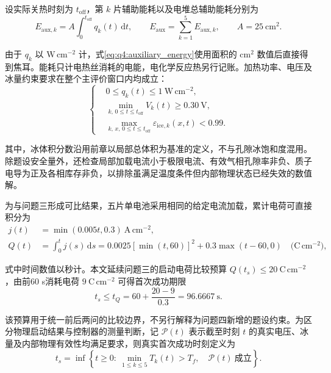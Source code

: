\documentclass[bwprint]{gmcmthesis}
\numberwithin{equation}{section}
\numberwithin{figure}{section}
\begin{document}
设实际关热时刻为 $t_{\mathrm{off}}$，第 $k$ 片辅助能耗以及电堆总辅助能耗分别为
\begin{equation}
E_{\mathrm{aux},k}=A\int_0^{t_{\mathrm{off}}}q_k(t)\,\mathrm dt,
\qquad E_{\mathrm{aux}}=\sum_{k=1}^{5}E_{\mathrm{aux},k},
\qquad A=25\ \mathrm{cm^2}.
\label{eq:q4:auxiliary_energy}
\end{equation}

由于 $q_k$ 以 $\mathrm{W\,cm^{-2}}$ 计，式\eqref{eq:q4:auxiliary_energy}使用面积的 $\mathrm{cm^2}$ 数值后直接得到焦耳。能耗只计电热丝消耗的电能，电化学反应热另行记账。加热功率、电压及冰量约束要求在整个主评价窗口内均成立：
\begin{equation}
\left\{\begin{aligned}
&0\leq q_k(t)\leq1\ \mathrm{W\,cm^{-2}},\\
&\min_{k,\,0\leq t\leq t_{\mathrm{off}}}V_k(t)\geq0.30\ \mathrm V,\\
&\max_{k,\,x,\,0\leq t\leq t_{\mathrm{off}}}\varepsilon_{\mathrm{ice},k}(x,t)<0.99.
\end{aligned}\right.
\label{eq:q4:path_constraints}
\end{equation}

其中，冰体积分数沿用前章以局部总体积为基准的定义，不与孔隙冰饱和度混用。除题设安全量外，还检查局部加载电流小于极限电流、有效气相孔隙率非负、质子电导为正及各相库存非负，以排除虽满足温度条件但内部物理状态已经失效的数值解。

为与问题三形成可比结果，五片单电池采用相同的给定电流加载，累计电荷可直接积分为
\begin{equation}
\begin{aligned}
j(t)&=\min(0.005t,0.3)\ \mathrm{A\,cm^{-2}},\\
Q(t)&=\int_0^tj(s)\,\mathrm ds
=0.0025[\min(t,60)]^2+0.3\max(t-60,0)
\quad\big(\mathrm{C\,cm^{-2}}\big),
\end{aligned}
\label{eq:q4:load_charge}
\end{equation}

式中时间数值以秒计。本文延续问题三的启动电荷比较预算 $Q(t_s)\leq20\ \mathrm{C\,cm^{-2}}$，由前60 s消耗电荷 $9\ \mathrm{C\,cm^{-2}}$ 可得首次成功期限
\begin{equation}
t_s\leq t_Q=60+\frac{20-9}{0.3}=96.6667\ \mathrm s.
\label{eq:q4:startup_deadline}
\end{equation}

该预算用于统一前后两问的比较边界，不另行解释为问题四新增的题设约束。为区分物理启动结果与控制器的测量判断，记 $\mathcal P(t)$ 表示截至时刻 $t$ 的真实电压、冰量及内部物理有效性均满足要求，则真实首次成功时刻定义为
\begin{equation}
t_s=\inf\left\{t\geq0:\ \min_{1\leq k\leq5}T_k(t)>T_f,
\quad\mathcal P(t)\ \text{成立}\right\}.
\label{eq:q4:true_first_success}
\end{equation}
\end{document}
